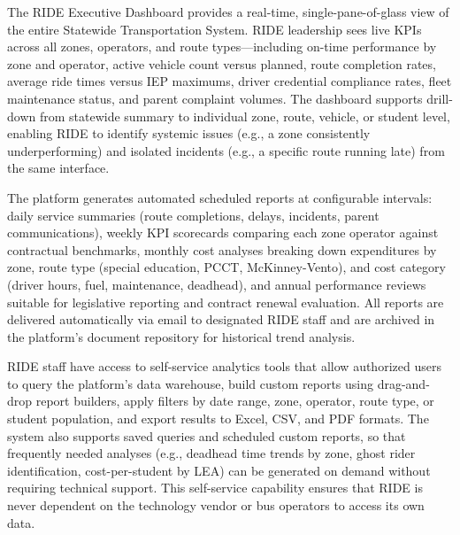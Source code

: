 \begin{description}[style=nextline, leftmargin=0.5cm]
    \item[\faIcon{chart-bar} \textbf{RIDE Executive Dashboard:}] The RIDE Executive Dashboard provides a real-time, single-pane-of-glass view of the entire Statewide Transportation System. RIDE leadership sees live KPIs across all zones, operators, and route types---including on-time performance by zone and operator, active vehicle count versus planned, route completion rates, average ride times versus IEP maximums, driver credential compliance rates, fleet maintenance status, and parent complaint volumes. The dashboard supports drill-down from statewide summary to individual zone, route, vehicle, or student level, enabling RIDE to identify systemic issues (e.g., a zone consistently underperforming) and isolated incidents (e.g., a specific route running late) from the same interface.

    \item[\faIcon{file-alt} \textbf{Automated Reporting:}] The platform generates automated scheduled reports at configurable intervals: daily service summaries (route completions, delays, incidents, parent communications), weekly KPI scorecards comparing each zone operator against contractual benchmarks, monthly cost analyses breaking down expenditures by zone, route type (special education, PCCT, McKinney-Vento), and cost category (driver hours, fuel, maintenance, deadhead), and annual performance reviews suitable for legislative reporting and contract renewal evaluation. All reports are delivered automatically via email to designated RIDE staff and are archived in the platform's document repository for historical trend analysis.

    \item[\faIcon{search} \textbf{Ad Hoc Analysis:}] RIDE staff have access to self-service analytics tools that allow authorized users to query the platform's data warehouse, build custom reports using drag-and-drop report builders, apply filters by date range, zone, operator, route type, or student population, and export results to Excel, CSV, and PDF formats. The system also supports saved queries and scheduled custom reports, so that frequently needed analyses (e.g., deadhead time trends by zone, ghost rider identification, cost-per-student by LEA) can be generated on demand without requiring technical support. This self-service capability ensures that RIDE is never dependent on the technology vendor or bus operators to access its own data.


\end{description}
